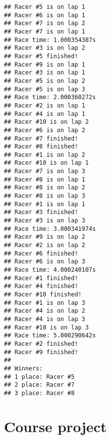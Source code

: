\documentclass[]{book}
\begin{document}
\begin{verbatim}
## Racer #5 is on lap 1
## Racer #6 is on lap 1
## Racer #7 is on lap 2
## Racer #7 is on lap 1
## Race time: 1.000354387s
## Racer #3 is on lap 2
## Racer #5 finished!
## Racer #9 is on lap 1
## Racer #3 is on lap 1
## Racer #5 is on lap 2
## Racer #5 is on lap 3
## Race time: 2.000360272s
## Racer #2 is on lap 1
## Racer #4 is on lap 1
## Racer #10 is on lap 2
## Racer #6 is on lap 2
## Racer #7 finished!
## Racer #8 finished!
## Racer #1 is on lap 2
## Racer #10 is on lap 1
## Racer #7 is on lap 3
## Racer #8 is on lap 1
## Racer #8 is on lap 2
## Racer #8 is on lap 3
## Racer #1 is on lap 1
## Racer #3 finished!
## Racer #3 is on lap 3
## Race time: 3.000341974s
## Racer #9 is on lap 2
## Racer #2 is on lap 2
## Racer #6 finished!
## Racer #6 is on lap 3
## Race time: 4.000240107s
## Racer #1 finished!
## Racer #4 finished!
## Racer #10 finished!
## Racer #1 is on lap 3
## Racer #4 is on lap 2
## Racer #4 is on lap 3
## Racer #10 is on lap 3
## Race time: 5.000290642s
## Racer #2 finished!
## Racer #9 finished!
## 
## Winners:
## 1 place: Racer #5
## 2 place: Racer #7
## 3 place: Racer #8
\end{verbatim}

\hypertarget{course-project}{%
\chapter*{Course project}\label{course-project}}
\end{document}
